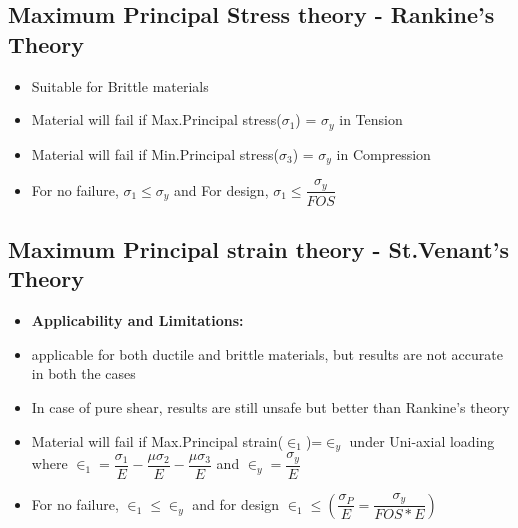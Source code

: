 \documentclass[8pt]{report}
\begin{document}
		\subsection{Maximum Principal Stress theory - Rankine's Theory}
			\begin{itemize}
				\item Suitable for Brittle materials
				\item Material will fail if Max.Principal stress($\sigma_1$) = $\sigma_y$ in Tension
				\item Material will fail if Min.Principal stress($\sigma_3$) = $\sigma_y$ in Compression
				\item For no failure, $\sigma_1\le\sigma_y$ and For design, $\sigma_1\le\dfrac{\sigma_y}{FOS}$		
			\end{itemize}\hrulefill
		\subsection{Maximum Principal strain theory - St.Venant's Theory}
			\begin{itemize}
				\item \textbf{Applicability and Limitations:}
				\item applicable for both ductile and brittle materials, but results are not accurate in both the cases
				\item In case of pure shear, results are still unsafe but better than Rankine's theory
				\item Material will fail if Max.Principal strain($\in_1$)=$\in_y$ under Uni-axial loading where $\boxed{\in_1=\dfrac{\sigma_1}{E}-\dfrac{\mu\sigma_2}{E}-\dfrac{\mu\sigma_3}{E}}$ and ${\in_y = \dfrac{\sigma_y}{E}}$
				\item For no failure, $\in_1\le\in_y$ and for design $\in_1\le\left(\dfrac{\sigma_P}{E}=\dfrac{\sigma_y}{FOS*E}\right)$
			\end{itemize}\hrulefill
\end{document}

